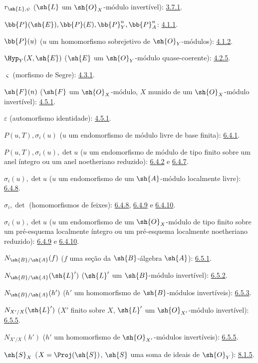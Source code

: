 \documentclass[oneside,10pt]{amsart}
\begin{document}
$r_{\sh{L},\psi}$ ($\sh{L}$ um $\sh{O}_X$-módulo invertível): \hyperref[II.3.7.1]{3.7.1}.

$\bb{P}(\sh{E}),\bb{P}(E),\bb{P}_Y^n,\bb{P}_A^n$: \hyperref[II.4.1.1]{4.1.1}.

$\bb{P}(u)$ ($u$ um homomorfismo sobrejetivo de $\sh{O}_Y$-módulos): \hyperref[II.4.1.2]{4.1.2}.

$\Hyp_Y(X,\sh{E})$ ($\sh{E}$ um $\sh{O}_Y$-módulo quase-coerente): \hyperref[II.4.2.5]{4.2.5}.

$\varsigma$ (morfismo de Segre): \hyperref[II.4.3.1]{4.3.1}.

$\sh{F}(n)$ ($\sh{F}$ um $\sh{O}_X$-módulo, $X$ munido de um
$\sh{O}_X$-módulo invertível): \hyperref[II.4.5.1]{4.5.1}.

$\varepsilon$ (automorfismo identidade): \hyperref[II.4.5.1]{4.5.1}.

$P(u,T),\sigma_i(u)$ ($u$ um endomorfismo de módulo livre de base finita): \hyperref[II.6.4.1]{6.4.1}.

$P(u,T),\sigma_i(u),\det u$
($u$ um endomorfismo de módulo de tipo finito sobre um anel íntegro ou um
anel noetheriano reduzido): \hyperref[II.6.4.2]{6.4.2} e \hyperref[II.6.4.7]{6.4.7}.

$\sigma_i(u),\det u$ ($u$ um endomorfismo de um $\sh{A}$-módulo localmente livre): \hyperref[II.6.4.8]{6.4.8}.

$\sigma_i,\det$ (homomorfismos de feixes): \hyperref[II.6.4.8]{6.4.8}, \hyperref[II.6.4.9]{6.4.9} e \hyperref[II.6.4.10]{6.4.10}.

$\sigma_i(u),\det u$
($u$ um endomorfismo de um $\sh{O}_X$-módulo de tipo finito sobre um pré-esquema
localmente íntegro ou um pré-esquema localmente noetheriano reduzido):
\hyperref[II.6.4.9]{6.4.9} e \hyperref[II.6.4.10]{6.4.10}.

$N_{\sh{B}/\sh{A}}(f)$
($f$ uma seção da $\sh{B}$-álgebra $\sh{A}$): \hyperref[II.6.5.1]{6.5.1}.

$N_{\sh{B}/\sh{A}}(\sh{L}')$
($\sh{L}'$ um $\sh{B}$-módulo invertível): \hyperref[II.6.5.2]{6.5.2}.

$N_{\sh{B}/\sh{A}}(h')$
($h'$ um homomorfismo de $\sh{B}$-módulos invertíveis): \hyperref[II.6.5.3]{6.5.3}.

$N_{X'/X}(\sh{L}')$
($X'$ finito sobre $X$, $\sh{L}'$ um $\sh{O}_{X'}$-módulo invertível): \hyperref[II.6.5.5]{6.5.5}.

$N_{X'/X}(h')$
($h'$ um homomorfismo de $\sh{O}_{X'}$-módulos invertíveis): \hyperref[II.6.5.5]{6.5.5}.

$\sh{S}_X$ ($X=\Proj(\sh{S})$, $\sh{S}$ uma soma de ideais de
$\sh{O}_Y$): \hyperref[II.8.1.5]{8.1.5}.
\end{document}
